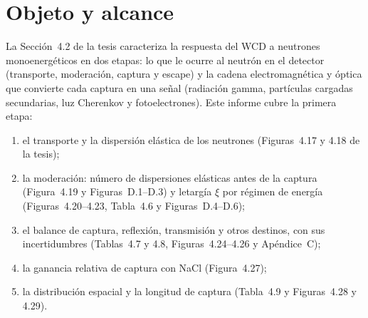 \documentclass[11pt,a4paper]{article}
\begin{document}
\begin{abstract}
Este informe reúne los resultados de la Sección~4.2 de la tesis sobre la respuesta del detector Cherenkov de agua (WCD) a flujos monocromáticos de neutrones, en lo que concierne al propio neutrón: su transporte, su moderación y su captura en el volumen detector. La base son las 64 corridas de la Campaña~1: dieciséis energías de inyección entre 1~meV y 1~keV, cuatro medios (agua pura y soluciones con 2.5, 5 y 10~\% de NaCl en masa), $10^5$ neutrones por corrida y física \texttt{QGSP\_BERT\_HP} sin $S(\alpha,\beta)$. Dos scripts del repositorio procesan los archivos crudos en alrededor de un minuto y reproducen exactamente las cifras de la tesis; un notebook regenera todas sus figuras. El informe presenta el número medio de pasos de transporte y de dispersiones elásticas, la distribución del número de dispersiones antes de la captura ($\langle N\rangle$ pasa de 44.8 a 76.8 entre 1~meV y 1~keV en agua pura), la letargía por colisión $\xi$ en los regímenes frío, térmico, epitérmico e intermedio, el balance de captura, reflexión, transmisión y otros destinos con su tratamiento estadístico multinomial (la captura en agua pura va de 17.4 a 35.9~\%, y el NaCl la eleva hasta 51.4~\%), la ganancia relativa de captura y la longitud de captura. La respuesta electromagnética posterior a la captura, la carga registrada por el fotomultiplicador y la eficiencia de detección se tratan en un informe técnico aparte; aquí se deja establecido el enlace entre ambos.
\end{abstract}

\tableofcontents

\section{Objeto y alcance}
\label{sec:objeto}

La Sección~4.2 de la tesis caracteriza la respuesta del WCD a neutrones monoenergéticos en dos etapas: lo que le ocurre al neutrón en el detector (transporte, moderación, captura y escape) y la cadena electromagnética y óptica que convierte cada captura en una señal (radiación gamma, partículas cargadas secundarias, luz Cherenkov y fotoelectrones). Este informe cubre la primera etapa:

\begin{enumerate}
  \item el transporte y la dispersión elástica de los neutrones (Figuras~4.17 y 4.18 de la tesis);
  \item la moderación: número de dispersiones elásticas antes de la captura (Figura~4.19 y Figuras~D.1--D.3) y letargía $\xi$ por régimen de energía (Figuras~4.20--4.23, Tabla~4.6 y Figuras~D.4--D.6);
  \item el balance de captura, reflexión, transmisión y otros destinos, con sus incertidumbres (Tablas~4.7 y 4.8, Figuras~4.24--4.26 y Apéndice~C);
  \item la ganancia relativa de captura con NaCl (Figura~4.27);
  \item la distribución espacial y la longitud de captura (Tabla~4.9 y Figuras~4.28 y 4.29).
\end{enumerate}
\end{document}
